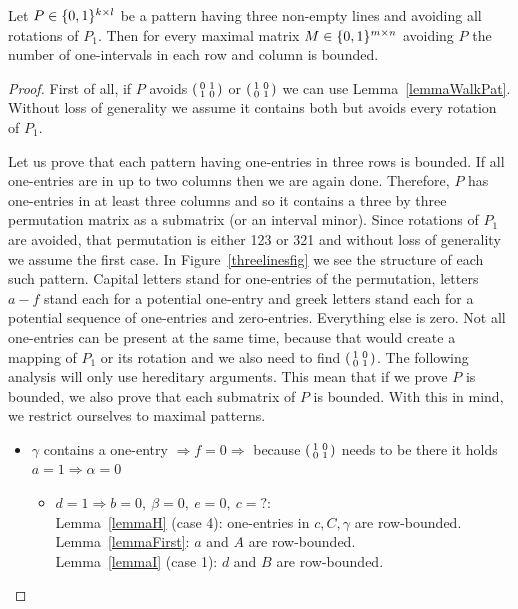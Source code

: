 \begin{lemma}
Let $P\in\{0,1\}^{k\times l}$ be a pattern having three non-empty lines and avoiding all rotations of $P_1$. Then for every maximal matrix $M\in\{0,1\}^{m\times n}$ avoiding $P$ the number of one-intervals in each row and column is bounded. 
\end{lemma}
\begin{proof}
First of all, if $P$ avoids $\left(\begin{smallmatrix}0&1\\1&0\end{smallmatrix}\right)$ or $\left(\begin{smallmatrix}1&0\\0&1\end{smallmatrix}\right)$ we can use Lemma~\ref{lemmaWalkPat}. Without loss of generality we assume it contains both but avoids every rotation of $P_1$.

Let us prove that each pattern having one-entries in three rows is bounded. If all one-entries are in up to two columns then we are again done. Therefore, $P$ has one-entries in at least three columns and so it contains a three by three permutation matrix as a submatrix (or an interval minor). Since rotations of $P_1$ are avoided, that permutation is either 123 or 321 and without loss of generality we assume the first case. In Figure~\ref{threelinesfig} we see the structure of each such pattern. Capital letters stand for one-entries of the permutation, letters $a-f$ stand each for a potential one-entry and greek letters stand each for a potential sequence of one-entries and zero-entries. Everything else is zero. Not all one-entries can be present at the same time, because that would create a mapping of $P_1$ or its rotation and we also need to find $\left(\begin{smallmatrix}1&0\\0&1\end{smallmatrix}\right)$. The following analysis will only use hereditary arguments. This mean that if we prove $P$ is bounded, we also prove that each submatrix of $P$ is bounded. With this in mind, we restrict ourselves to maximal patterns.
\begin{itemize}
	\item $\gamma$ contains a one-entry $\Rightarrow f=0\Rightarrow$ because $\left(\begin{smallmatrix}1&0\\0&1\end{smallmatrix}\right)$ needs to be there it holds $a=1\Rightarrow\alpha=0$
		\begin{itemize}
			\item $d=1\Rightarrow b=0,\ \beta=0,\ e=0,\ c=?$:\\
				Lemma~\ref{lemmaH} (case 4): one-entries in $c,C,\gamma$ are row-bounded.\\
				Lemma~\ref{lemmaFirst}: $a$ and $A$ are row-bounded.\\
				Lemma~\ref{lemmaI} (case 1): $d$ and $B$ are row-bounded.\\
				

\end{itemize}
\end{itemize}
\end{proof}
